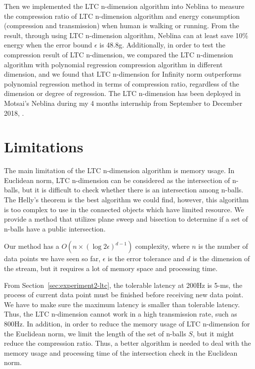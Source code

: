 Then we implemented the LTC n-dimension algorithm into Neblina to measure the
compression ratio of LTC n-dimension algorithm and energy consumption
(compression and transmission) when human is walking or running. From the
result, through using LTC n-dimension algorithm, Neblina can at least save 10\%
energy when the error bound $\epsilon$ is 48.8g. Additionally, in order to test
the compression result of LTC n-dimension, we compared the LTC n-dimension
algorithm with polynomial regression compression algorithm in different
dimension, and we found that LTC n-dimension for Infinity norm  outperforms
polynomial regression method in terms of compression ratio, regardless of the
dimension or degree of regression. The LTC n-dimension has been deployed in Motsai's Neblina during my 4
months internship from September to December 2018, .

\section{Limitations}


The main limitation of the LTC n-dimension algorithm is memory usage. In
Euclidean norm, LTC n-dimension can be considered as the intersection of
n-balls, but it is difficult to check whether there is an intersection among
n-balls. The Helly's theorem is the best algorithm we could find,
however, this algorithm is too complex to use in the connected objects which
have limited resource.  We provide a method that utilizes plane sweep and
bisection to determine if a set of n-balls have a public intersection.

Our method has a $O(n\times (\log{2\epsilon})^{d-1})$ complexity,
where $n$ is the number of data points we have seen so far, $\epsilon$ is the
error tolerance and $d$ is the dimension of the stream, but it requires a lot of
memory space and processing time. 

From Section~\ref{sec:experiment2-ltc}, the tolerable latency at 200Hz is
5-ms, the process of current data point must be finished before receiving new
data point. We have to make sure the maximum latency is smaller than tolerable
latency. Thus, the LTC n-dimension cannot work in a high transmission rate, such
as 800Hz. In addition, in order to reduce the memory usage of LTC n-dimension
for the Euclidean norm, we limit the length of the set of n-balls $S$, but it
might reduce the compression ratio. Thus, a better algorithm is needed to deal
with the memory usage and processing time of the intersection check in the
Euclidean norm.


